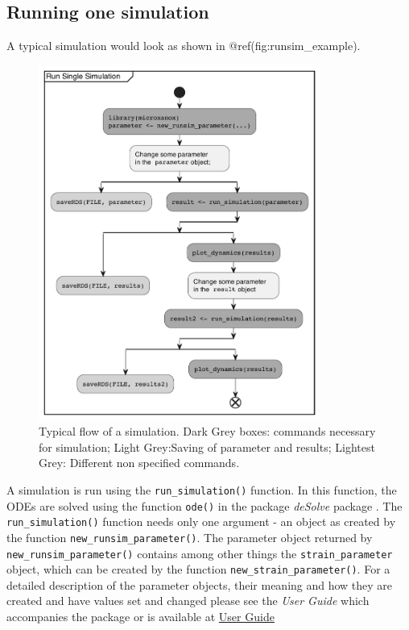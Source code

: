 \documentclass[]{elsarticle} %
\begin{document}
\hypertarget{running-one-simulation}{%
\subsection{Running one simulation}\label{running-one-simulation}}

A typical simulation would look as shown in @ref(fig:runsim\_example).

\begin{figure}

{\centering \includegraphics[width=350px]{./figures/simflow} 

}

\caption{Typical flow of a simulation. Dark Grey boxes: commands necessary for simulation; Light Grey:Saving of parameter and results; Lightest Grey: Different non specified commands.}\label{fig:runsim_example}
\end{figure}

A simulation is run using the \texttt{run\_simulation()} function. In
this function, the ODEs are solved using the function \texttt{ode()} in
the package \emph{deSolve} package \citep{Soetaert2010}. The
\texttt{run\_simulation()} function needs only one argument - an object
as created by the function \texttt{new\_runsim\_parameter()}. The
parameter object returned by \texttt{new\_runsim\_parameter()} contains
among other things the \texttt{strain\_parameter} object, which can be
created by the function \texttt{new\_strain\_parameter()}. For a
detailed description of the parameter objects, their meaning and how
they are created and have values set and changed please see the
\emph{User Guide} which accompanies the package or is available at
\href{@LINK_NEEDED}{User Guide}
\end{document}
